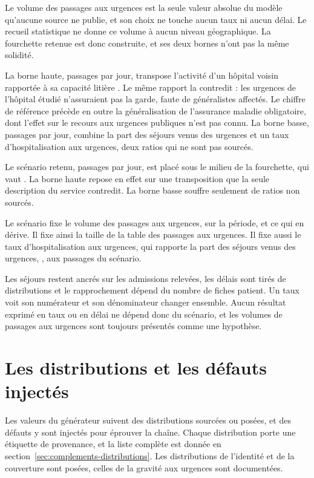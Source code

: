 Le volume des passages aux urgences est la seule valeur absolue du modèle qu'aucune source ne
publie, et son choix ne touche aucun taux ni aucun délai. Le recueil statistique ne donne ce volume
à aucun niveau géographique. La fourchette retenue est donc construite, et ses deux bornes n'ont pas
la même solidité.

La borne haute,  passages par jour, transpose l'activité d'un hôpital
voisin rapportée à sa capacité litière \cite{s20}. Le même rapport la contredit : les urgences de
l'hôpital étudié n'assuraient pas la garde, faute de généralistes affectés. Le chiffre de référence
précède en outre la généralisation de l'assurance maladie obligatoire, dont l'effet sur le recours
aux urgences publiques n'est pas connu. La borne basse,  passages par
jour, combine la part des séjours venus des urgences et un taux d'hospitalisation aux urgences, deux
ratios qui ne sont pas sourcés.

Le scénario retenu,  passages par jour, est placé sous le milieu
de la fourchette, qui vaut . La borne haute repose en effet sur
une transposition que la seule description du service contredit. La borne basse souffre seulement de ratios non sourcés.

Le scénario fixe le volume des passages aux urgences,  sur la
période, et ce qui en dérive. Il fixe ainsi la taille de la table des passages aux urgences. Il
fixe aussi le taux d'hospitalisation aux urgences, qui rapporte la part des séjours venus des urgences,
, aux passages du scénario.

Les séjours restent ancrés sur les
admissions relevées, les délais sont tirés de distributions et le rapprochement dépend du nombre de
fiches patient. Un taux voit son numérateur et son dénominateur changer ensemble. Aucun résultat
exprimé en taux ou en délai ne dépend donc du scénario, et les volumes de passages aux urgences sont
toujours présentés comme une hypothèse.

\section{Les distributions et les défauts injectés}

Les valeurs du générateur suivent des distributions sourcées ou posées, et des défauts y sont
injectés pour éprouver la chaîne. Chaque distribution porte une étiquette de provenance, et la
liste complète est donnée en section~\ref{sec:complements-distributions}. Les distributions de
l'identité et de la couverture sont posées, celles de la gravité aux urgences sont documentées.

